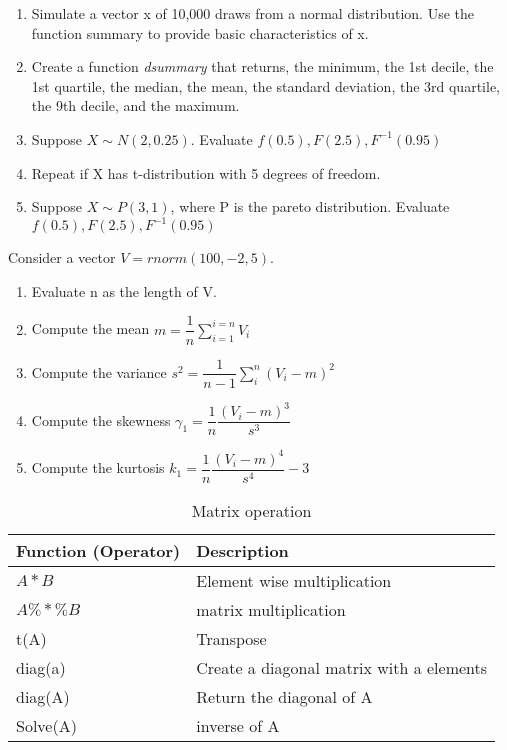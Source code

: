 \documentclass[11pt,a4paper]{article}
\newcommand{\1}{\mathbb{1}}
\begin{document}
\begin{Exercise}[title = Simulating and Computing]
\begin{enumerate}
\item Simulate a vector x of 10,000 draws from a normal distribution. Use the function summary to provide basic characteristics of x.
\item Create a function \emph{dsummary} that returns, the minimum, the 1st decile, the 1st quartile, the median, the mean, the standard deviation, the 3rd quartile, the 9th decile, and the maximum. 
\item Suppose $X \sim N(2,0.25)$. Evaluate 
 $f(0.5), F(2.5), F^{-1}(0.95)$
\item Repeat if X has t-distribution with 5 degrees of freedom.
\item Suppose $X \sim P(3,1)$, where P is the pareto distribution. Evaluate $f(0.5), F(2.5), F^{-1}(0.95)$
\end{enumerate}
\end{Exercise}



%

\begin{Exercise}[title = Moments]
Consider a vector $V = rnorm(100,-2,5)$.
\begin{enumerate}
\item Evaluate n as the length of V.
\item Compute the mean $m = \dfrac{1}{n}\sum_{i=1}^{i=n} V_i$
\item Compute the variance $s^2 = \dfrac{1}{n-1} \sum_i^n (V_i-m)^2$
\item Compute the skewness $\gamma_1 = \dfrac{1}{n} \dfrac{(V_i-m)^3}{s^3}$
\item Compute the kurtosis $k_1 = \dfrac{1}{n} \dfrac{(V_i-m)^4}{s^4} - 3$
\end{enumerate}
\end{Exercise}


\FloatBarrier
\begin{table}
\caption{Matrix operation}
\begin{center}
\begin{tabular}{ll}
Function (Operator) 	& Description \\ \hline 
$A * B$
	& Element wise multiplication \\
$A\%*\%B$
 &	matrix multiplication \\
t(A) &	Transpose \\	
diag(a) &	Create a diagonal matrix with a elements \\
diag(A) &	Return the diagonal of A \\	
Solve(A) &	inverse of A \\	
 \hline 	 
\end{tabular} 
\end{center}
\end{table}
\end{document}
